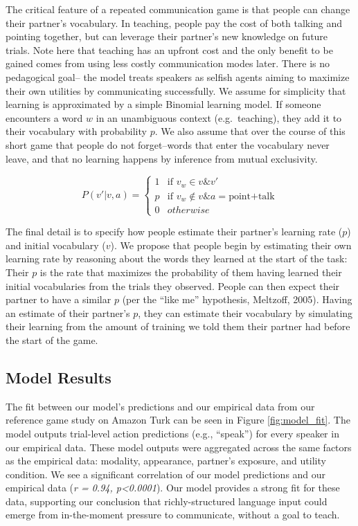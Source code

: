 \documentclass[english,,man,floatsintext]{apa6}
\begin{document}
The critical feature of a repeated communication game is that people can change their partner's vocabulary. In teaching, people pay the cost of both talking and pointing together, but can leverage their partner's new knowledge on future trials. Note here that teaching has an upfront cost and the only benefit to be gained comes from using less costly communication modes later. There is no pedagogical goal-- the model treats speakers as selfish agents aiming to maximize their own utilities by communicating successfully. We assume for simplicity that learning is approximated by a simple Binomial learning model. If someone encounters a word \(w\) in an unambiguous context (e.g.~teaching), they add it to their vocabulary with probability \(p\). We also assume that over the course of this short game that people do not forget--words that enter the vocabulary never leave, and that no learning happens by inference from mutual exclusivity.

\[
P\left(v'|v,a\right)= \begin{cases} 
1 & \text{if } v_{w} \in v \& v'\\ 
p & \text{if } v_{w} \notin v \& a = \text{point+talk}\\ 
0 & otherwise\end{cases}
\]

The final detail is to specify how people estimate their partner's learning rate (\(p\)) and initial vocabulary (\(v\)). We propose that people begin by estimating their own learning rate by reasoning about the words they learned at the start of the task: Their \(p\) is the rate that maximizes the probability of them having learned their initial vocabularies from the trials they observed. People can then expect their partner to have a similar \(p\) (per the ``like me'' hypothesis, Meltzoff, 2005). Having an estimate of their partner's \(p\), they can estimate their vocabulary by simulating their learning from the amount of training we told them their partner had before the start of the game.

\hypertarget{model-results}{%
\subsection{Model Results}\label{model-results}}

The fit between our model's predictions and our empirical data from our reference game study on Amazon Turk can be seen in Figure \ref{fig:model_fit}. The model outputs trial-level action predictions (e.g., \enquote{speak}) for every speaker in our empirical data. These model outputs were aggregated across the same factors as the empirical data: modality, appearance, partner's exposure, and utility condition. We see a significant correlation of our model predictions and our empirical data (\emph{r = 0.94, p\textless{}0.0001}). Our model provides a strong fit for these data, supporting our conclusion that richly-structured language input could emerge from in-the-moment pressure to communicate, without a goal to teach.
\end{document}
